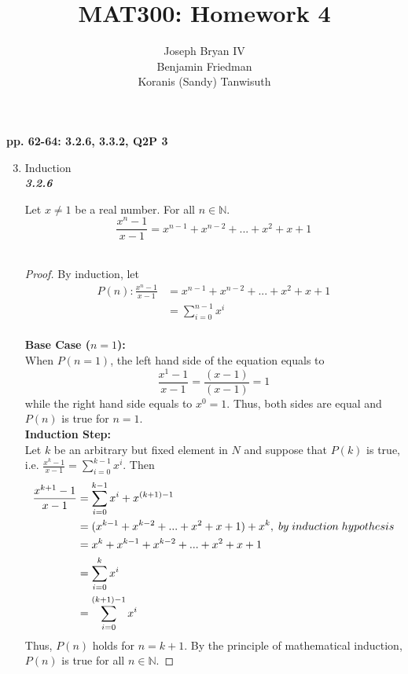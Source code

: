 \documentclass{article}
\begin{document}
\title{MAT300: Homework 4}
\author{
	Joseph Bryan IV\\
	Benjamin Friedman\\
	Koranis (Sandy) Tanwisuth
}

\maketitle
	\begin{flushleft}
		\textbf{pp. 62-64: 3.2.6, 3.3.2, Q2P 3}
	\begin{enumerate}
		\setcounter{enumi}{2}
		\item Induction \\
		
		\textbf{\textit{3.2.6}}
		\begin{flushleft}
			Let $x \neq 1$ be a real number. For all $n \in \mathbb{N}$. 
			\begin{equation}
				\frac{x^n-1}{x-1} = x^{n-1}+x^{n-2}+...+x^2+x+1
			\end{equation}
			\\
			\begin{proof}
				By induction, let \\
				\begin{align*}
					P(n): \frac{x^n-1}{x-1} & = x^{n-1}+x^{n-2}+...+x^2+x+1 \\
					& = \sum\limits_{i=0}^{n-1} x^i
				\end{align*} \\
				\textbf{Base Case ($n = 1$):}
				\\ When $P(n=1)$, the left hand side of the equation equals to \[\frac{x^1-1}{x-1} = \frac{(x-1)}{(x-1)}  = 1 \]
				while the right hand side equals to $x^0 = 1$. Thus, both sides are equal and $P(n)$ is true for $n=1$.
				\\
				\pagebreak
				\textbf{Induction Step:}
				\\
				Let $k$ be an arbitrary but fixed element in $N$ and suppose that $P(k)$ is true, i.e. $\frac{x^k-1}{x-1} = \sum\limits_{i=0}^{k-1} x^i$. Then
				\begin{align*}
					\frac{x^{k+1}-1}{x-1}
					& = \sum\limits_{i=0}^{k-1} x^i + x^{(k+1)-1} \\
					& = (x^{k-1}+x^{k-2}+...+x^2+x+1) + x^k, \thickspace by \thickspace induction \thickspace hypothesis \\
					& = x^k+x^{k-1}+x^{k-2}+...+x^2+x+1 \\
					& = \sum\limits_{i=0}^{k} x^i \\
					& = \sum\limits_{i=0}^{(k+1)-1} x^i 
				\end{align*}
				Thus, $P(n)$ holds for $n=k+1$. 
				By the principle of mathematical induction, $P(n)$ is true for all $n \in \mathbb{N}$.
			\end{proof}
			

\end{flushleft}
\end{enumerate}
\end{flushleft}
\end{document}
